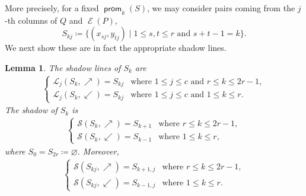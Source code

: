 \documentclass{amsart}
\newtheorem{lemma}[theorem]{Lemma}
\theoremstyle{definition}
\DeclareMathOperator{\prom}{\mathsf{prom}}
\DeclareMathOperator{\evacuation}{\mathcal{E}}
\begin{document}
More precisely, for a fixed $\prom_k(S)$, we may consider pairs coming from the $j$-th columns of $Q$ and $\evacuation(P)$,
  \[ S_{kj} \coloneqq \{(x_{sj},y_{tj}) \mid 1 \leq s, t \leq r\text{ and }s+t-1=k\}. \]
We next show these are in fact the appropriate shadow lines.

\begin{lemma}\label{lem:proof-shadows}
    The shadow lines of $S_k$ are
    \begin{align*}
    \begin{cases}
        \mathcal{L}_j(S_k, \nearrow) = S_{kj}
          & \text{where }1 \leq j \leq c\text{ and }r \leq k \leq 2r-1, \\
        \mathcal{L}_j(S_k, \swarrow) = S_{kj}
          & \text{where }1 \leq j \leq c\text{ and }1 \leq k \leq r.
    \end{cases}
    \end{align*}
    The shadow of $S_k$ is
    \begin{align*}
    \begin{cases}
        \mathcal{S}(S_k, \nearrow) = S_{k+1}
          & \text{where }r \leq k \leq 2r-1, \\
        \mathcal{S}(S_k, \swarrow) = S_{k-1}
          & \text{where }1 \leq k \leq r,
    \end{cases}
    \end{align*}
    where $S_0 = S_{2r} \coloneqq \varnothing$. Moreover,
    \begin{align*}
    \begin{cases}
        \mathcal{S}(S_{kj}, \nearrow) = S_{k+1,j}
          & \text{where }r \leq k \leq 2r-1, \\
        \mathcal{S}(S_{kj}, \swarrow) = S_{k-1,j}
          & \text{where }1 \leq k \leq r.
    \end{cases}
    \end{align*}
\end{lemma}
\end{document}
